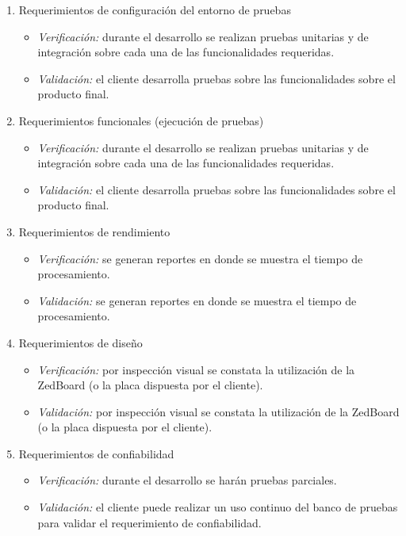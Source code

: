 \documentclass[
11pt, %
]{charter}
\begin{document}
\begin{enumerate}
	\item Requerimientos de configuración del entorno de pruebas
	\begin{itemize}
		\item \emph{Verificación:} durante el desarrollo se realizan pruebas unitarias y de integración sobre cada una de las funcionalidades requeridas.
		\item \emph{Validación:} el cliente desarrolla pruebas sobre las funcionalidades sobre el producto final.
	\end{itemize}
		
	\item Requerimientos funcionales (ejecución de pruebas)
	\begin{itemize}
		\item \emph{Verificación:} durante el desarrollo se realizan pruebas unitarias y de integración sobre cada una de las funcionalidades requeridas.
		\item \emph{Validación:} el cliente desarrolla pruebas sobre las funcionalidades sobre el producto final.
	\end{itemize}

	\item Requerimientos de rendimiento
	\begin{itemize}
		\item \emph{Verificación:} se generan reportes en donde se muestra el tiempo de procesamiento.
		\item \emph{Validación:} se generan reportes en donde se muestra el tiempo de procesamiento.
	\end{itemize}

	\item Requerimientos de diseño
	\begin{itemize}
		\item \emph{Verificación:} por inspección visual se constata la utilización de la ZedBoard (o la placa dispuesta por el cliente). 
		\item \emph{Validación:} por inspección visual se constata la utilización de la ZedBoard (o la placa dispuesta por el cliente). 
	\end{itemize}

	\item Requerimientos de confiabilidad 
	\begin{itemize}
		\item \emph{Verificación:} durante el desarrollo se harán pruebas parciales. 
		\item \emph{Validación:} el cliente puede realizar un uso continuo del banco de pruebas para validar el requerimiento de confiabilidad.
	\end{itemize}


\end{enumerate}
\end{document}
